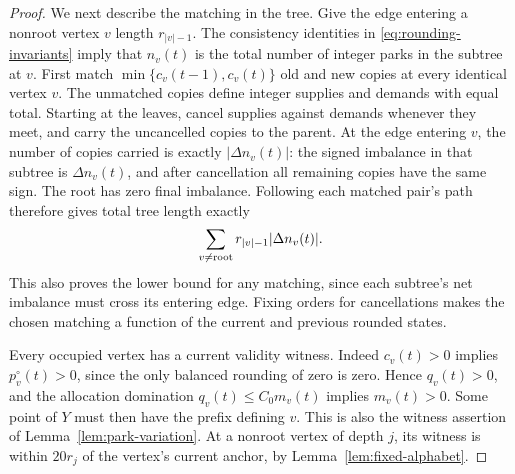\begin{proof}
We next describe the matching in the tree.  Give the edge entering a nonroot
vertex $v$ length $r_{|v|-1}$.  The consistency identities in
\eqref{eq:rounding-invariants} imply that $n_v(t)$ is the total number of
integer parks in the subtree at $v$.  First match
$\min\{c_v(t-1),c_v(t)\}$ old and new copies at every identical vertex $v$.
The unmatched copies define integer supplies and demands with equal total.
Starting at the leaves, cancel supplies against demands whenever they meet,
and carry the uncancelled copies to the parent.  At the edge entering $v$,
the number of copies carried is exactly $|\Delta n_v(t)|$: the signed
imbalance in that subtree is $\Delta n_v(t)$, and after cancellation all
remaining copies have the same sign.  The root has zero final imbalance.
Following each matched pair's path therefore gives total tree length exactly
\begin{equation}\label{eq:rounding-transport-cost}
                   \sum_{v\ne{\rm root}}r_{|v|-1}|\Delta n_v(t)|.
\end{equation}
This also proves the lower bound for any matching, since each subtree's net
imbalance must cross its entering edge.  Fixing orders for cancellations
makes the chosen matching a function of the current and previous rounded
states.

Every occupied vertex has a current validity witness.  Indeed $c_v(t)>0$
implies $p_v^\circ(t)>0$, since the only balanced rounding of zero is zero.
Hence $q_v(t)>0$, and the allocation domination $q_v(t)\le C_0m_v(t)$ implies
$m_v(t)>0$.  Some point of $Y$ must then have the prefix defining $v$.
This is also the witness assertion of Lemma~\ref{lem:park-variation}.
At a nonroot vertex of depth $j$, its witness is within $20r_j$ of the
vertex's current anchor, by Lemma~\ref{lem:fixed-alphabet}.


\end{proof}
